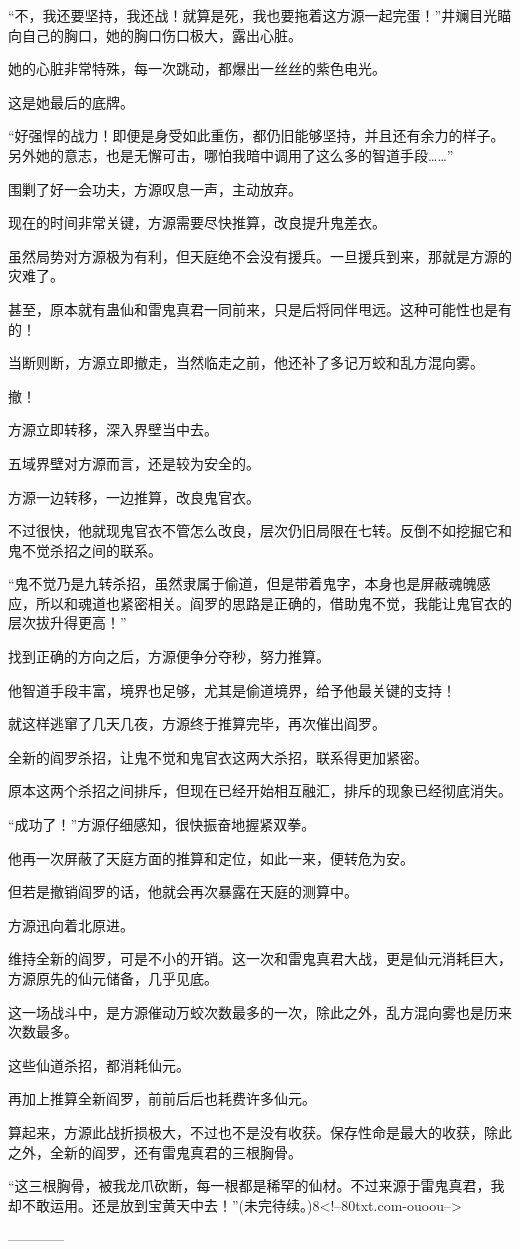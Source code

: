 \begin{this_body}
“不，我还要坚持，我还战！就算是死，我也要拖着这方源一起完蛋！”井斓目光瞄向自己的胸口，她的胸口伤口极大，露出心脏。

她的心脏非常特殊，每一次跳动，都爆出一丝丝的紫色电光。

这是她最后的底牌。

“好强悍的战力！即便是身受如此重伤，都仍旧能够坚持，并且还有余力的样子。另外她的意志，也是无懈可击，哪怕我暗中调用了这么多的智道手段……”

围剿了好一会功夫，方源叹息一声，主动放弃。

现在的时间非常关键，方源需要尽快推算，改良提升鬼差衣。

虽然局势对方源极为有利，但天庭绝不会没有援兵。一旦援兵到来，那就是方源的灾难了。

甚至，原本就有蛊仙和雷鬼真君一同前来，只是后将同伴甩远。这种可能性也是有的！

当断则断，方源立即撤走，当然临走之前，他还补了多记万蛟和乱方混向雾。

撤！

方源立即转移，深入界壁当中去。

五域界壁对方源而言，还是较为安全的。

方源一边转移，一边推算，改良鬼官衣。

不过很快，他就现鬼官衣不管怎么改良，层次仍旧局限在七转。反倒不如挖掘它和鬼不觉杀招之间的联系。

“鬼不觉乃是九转杀招，虽然隶属于偷道，但是带着鬼字，本身也是屏蔽魂魄感应，所以和魂道也紧密相关。阎罗的思路是正确的，借助鬼不觉，我能让鬼官衣的层次拔升得更高！”

找到正确的方向之后，方源便争分夺秒，努力推算。

他智道手段丰富，境界也足够，尤其是偷道境界，给予他最关键的支持！

就这样逃窜了几天几夜，方源终于推算完毕，再次催出阎罗。

全新的阎罗杀招，让鬼不觉和鬼官衣这两大杀招，联系得更加紧密。

原本这两个杀招之间排斥，但现在已经开始相互融汇，排斥的现象已经彻底消失。

“成功了！”方源仔细感知，很快振奋地握紧双拳。

他再一次屏蔽了天庭方面的推算和定位，如此一来，便转危为安。

但若是撤销阎罗的话，他就会再次暴露在天庭的测算中。

方源迅向着北原进。

维持全新的阎罗，可是不小的开销。这一次和雷鬼真君大战，更是仙元消耗巨大，方源原先的仙元储备，几乎见底。

这一场战斗中，是方源催动万蛟次数最多的一次，除此之外，乱方混向雾也是历来次数最多。

这些仙道杀招，都消耗仙元。

再加上推算全新阎罗，前前后后也耗费许多仙元。

算起来，方源此战折损极大，不过也不是没有收获。保存性命是最大的收获，除此之外，全新的阎罗，还有雷鬼真君的三根胸骨。

“这三根胸骨，被我龙爪砍断，每一根都是稀罕的仙材。不过来源于雷鬼真君，我却不敢运用。还是放到宝黄天中去！”(未完待续。)8<!--80txt.com-ouoou-->

------------

\end{this_body}


